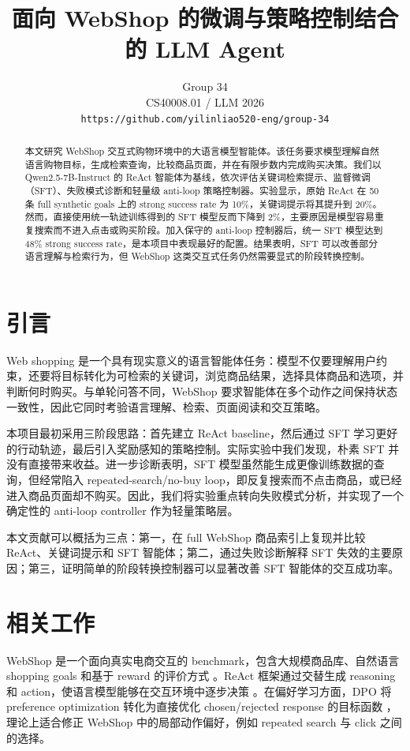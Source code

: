 \documentclass[11pt]{article}
\title{面向 WebShop 的微调与策略控制结合的 LLM Agent}
\author{
  Group 34 \\
  CS40008.01 / LLM 2026 \\
  \texttt{https://github.com/yilinliao520-eng/group-34}
}
\begin{document}
\maketitle

\begin{abstract}
本文研究 WebShop 交互式购物环境中的大语言模型智能体。该任务要求模型理解自然语言购物目标，生成检索查询，比较商品页面，并在有限步数内完成购买决策。我们以 Qwen2.5-7B-Instruct 的 ReAct 智能体为基线，依次评估关键词检索提示、监督微调（SFT）、失败模式诊断和轻量级 anti-loop 策略控制器。实验显示，原始 ReAct 在 50 条 full synthetic goals 上的 strong success rate 为 10\%，关键词提示将其提升到 20\%。然而，直接使用统一轨迹训练得到的 SFT 模型反而下降到 2\%，主要原因是模型容易重复搜索而不进入点击或购买阶段。加入保守的 anti-loop 控制器后，统一 SFT 模型达到 48\% strong success rate，是本项目中表现最好的配置。结果表明，SFT 可以改善部分语言理解与检索行为，但 WebShop 这类交互式任务仍然需要显式的阶段转换控制。
\end{abstract}

\section{引言}

Web shopping 是一个具有现实意义的语言智能体任务：模型不仅要理解用户约束，还要将目标转化为可检索的关键词，浏览商品结果，选择具体商品和选项，并判断何时购买。与单轮问答不同，WebShop 要求智能体在多个动作之间保持状态一致性，因此它同时考验语言理解、检索、页面阅读和交互策略。

本项目最初采用三阶段思路：首先建立 ReAct baseline，然后通过 SFT 学习更好的行动轨迹，最后引入奖励感知的策略控制。实际实验中我们发现，朴素 SFT 并没有直接带来收益。进一步诊断表明，SFT 模型虽然能生成更像训练数据的查询，但经常陷入 repeated-search/no-buy loop，即反复搜索而不点击商品，或已经进入商品页面却不购买。因此，我们将实验重点转向失败模式分析，并实现了一个确定性的 anti-loop controller 作为轻量策略层。

本文贡献可以概括为三点：第一，在 full WebShop 商品索引上复现并比较 ReAct、关键词提示和 SFT 智能体；第二，通过失败诊断解释 SFT 失效的主要原因；第三，证明简单的阶段转换控制器可以显著改善 SFT 智能体的交互成功率。

\section{相关工作}

WebShop 是一个面向真实电商交互的 benchmark，包含大规模商品库、自然语言 shopping goals 和基于 reward 的评价方式 \cite{yao2022webshop}。ReAct 框架通过交替生成 reasoning 和 action，使语言模型能够在交互环境中逐步决策 \cite{yao2022react}。在偏好学习方面，DPO 将 preference optimization 转化为直接优化 chosen/rejected response 的目标函数 \cite{rafailov2023dpo}，理论上适合修正 WebShop 中的局部动作偏好，例如 repeated search 与 click 之间的选择。
\end{document}
